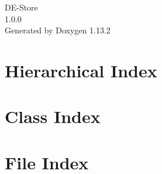 \documentclass[twoside]{book}
\newcommand{\+}{\discretionary{\mbox{\scriptsize$\hookleftarrow$}}{}{}}
\newcommand{\clearemptydoublepage}{%
    \newpage{\pagestyle{empty}\cleardoublepage}%
  }
\begin{document}
  \raggedbottom
    \hypersetup{pageanchor=false,
                bookmarksnumbered=true,
                pdfencoding=unicode
               }
  \begin{titlepage}
  \vspace*{7cm}
  \begin{center}%
  {\Large DE-\/\+Store}\\
  [1ex]\large 1.\+0.\+0 \\
  \vspace*{1cm}
  {\large Generated by Doxygen 1.13.2}\\
  \end{center}
  \end{titlepage}
  \clearemptydoublepage
  \tableofcontents
  \clearemptydoublepage
  \hypersetup{pageanchor=true}



\chapter{Hierarchical Index}

\chapter{Class Index}

\chapter{File Index}

\end{document}
